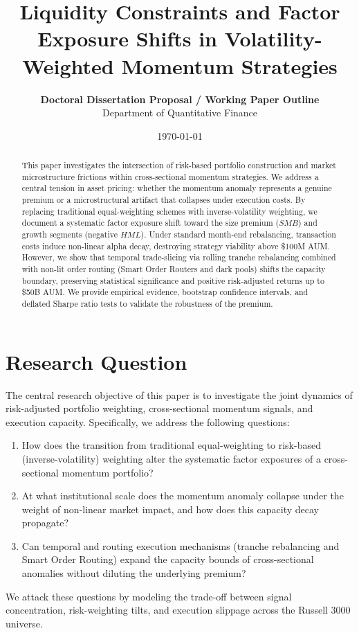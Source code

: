 \documentclass[12pt]{article}
\title{\textbf{Liquidity Constraints and Factor Exposure Shifts in Volatility-Weighted Momentum Strategies}}
\author{\textbf{Doctoral Dissertation Proposal / Working Paper Outline} \\
        Department of Quantitative Finance}
\date{\today}
\numberwithin{equation}{section}
\begin{document}
\maketitle

\begin{abstract}
This paper investigates the intersection of risk-based portfolio construction and market microstructure frictions within cross-sectional momentum strategies. We address a central tension in asset pricing: whether the momentum anomaly represents a genuine premium or a microstructural artifact that collapses under execution costs. By replacing traditional equal-weighting schemes with inverse-volatility weighting, we document a systematic factor exposure shift toward the size premium ($SMB$) and growth segments (negative $HML$). Under standard month-end rebalancing, transaction costs induce non-linear alpha decay, destroying strategy viability above \$100M AUM. However, we show that temporal trade-slicing via rolling tranche rebalancing combined with non-lit order routing (Smart Order Routers and dark pools) shifts the capacity boundary, preserving statistical significance and positive risk-adjusted returns up to \$50B AUM. We provide empirical evidence, bootstrap confidence intervals, and deflated Sharpe ratio tests to validate the robustness of the premium.
\end{abstract}

\newpage

\section{Research Question}
The central research objective of this paper is to investigate the joint dynamics of risk-adjusted portfolio weighting, cross-sectional momentum signals, and execution capacity. Specifically, we address the following questions:
\begin{enumerate}
    \item How does the transition from traditional equal-weighting to risk-based (inverse-volatility) weighting alter the systematic factor exposures of a cross-sectional momentum portfolio?
    \item At what institutional scale does the momentum anomaly collapse under the weight of non-linear market impact, and how does this capacity decay propagate?
    \item Can temporal and routing execution mechanisms (tranche rebalancing and Smart Order Routing) expand the capacity bounds of cross-sectional anomalies without diluting the underlying premium?
\end{enumerate}
We attack these questions by modeling the trade-off between signal concentration, risk-weighting tilts, and execution slippage across the Russell 3000 universe.
\end{document}
